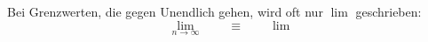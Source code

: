 Bei Grenzwerten, die gegen Unendlich gehen, wird oft nur $\lim$ geschrieben:
$$\lim_{n \to \infty} \qquad \equiv \qquad \lim$$